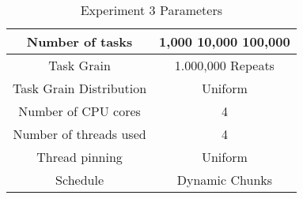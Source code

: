 \begin{table}
\centering
 \begin{tabular}{|c|c|}
  \hline
  Number of tasks & 1,000 10,000 100,000 \\
  \hline
  Task Grain & 1.000,000 Repeats \\
  \hline
  Task Grain Distribution & Uniform \\
  \hline
  Number of CPU cores & 4 \\
  \hline
  Number of threads used & 4 \\
  \hline
  Thread pinning & Uniform \\
  \hline
  Schedule & Dynamic Chunks \\
  \hline
 \end{tabular}
\caption{Experiment 3 Parameters}
\iflabelc
\label{table:evaluation_ex3_parameters}
\fi
{}
\end{table}
